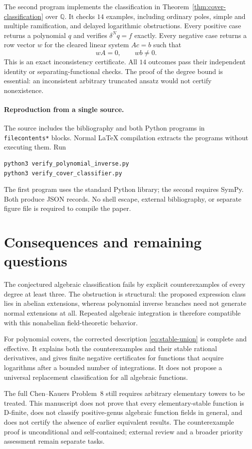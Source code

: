 The second program implements the classification in
Theorem~\ref{thm:cover-classification} over $\mathbb Q$. It checks $14$
examples, including ordinary poles, simple and multiple ramification,
and delayed logarithmic obstructions. Every positive case returns a
polynomial $q$ and verifies $\delta^Nq=f$ exactly. Every negative case
returns a row vector $w$ for the cleared linear system $Ac=b$ such that
\[
 wA=0,\qquad wb\ne0.
\]
This is an exact inconsistency certificate. All $14$ outcomes pass their
independent identity or separating-functional checks. The proof of the
degree bound is essential: an inconsistent arbitrary truncated ansatz
would not certify nonexistence.

\paragraph{Reproduction from a single source.}
The source includes the bibliography and both Python programs in
\texttt{filecontents*} blocks. Normal LaTeX compilation extracts the
programs without executing them. Run
\begin{verbatim}
python3 verify_polynomial_inverse.py
python3 verify_cover_classifier.py
\end{verbatim}
The first program uses the standard Python library; the second requires
SymPy. Both produce JSON records. No shell escape, external bibliography,
or separate figure file is required to compile the paper.

\section{Consequences and remaining questions}
The conjectured algebraic classification fails by explicit counterexamples
of every degree at least three. The obstruction is structural: the
proposed expression class lies in abelian extensions, whereas polynomial
inverse branches need not generate normal extensions at all. Repeated
algebraic integration is therefore compatible with this nonabelian
field-theoretic behavior.

For polynomial covers, the corrected description
\eqref{eq:stable-union} is complete and effective. It explains both the
counterexamples and their stable rational derivatives, and gives finite
negative certificates for functions that acquire logarithms after a
bounded number of integrations. It does not propose a universal
replacement classification for all algebraic functions.

The full Chen--Kauers Problem~8 still requires arbitrary elementary
towers to be treated. This manuscript does not prove that every
elementary-stable function is D-finite, does not classify positive-genus
algebraic function fields in general, and does not certify the absence
of earlier equivalent results. The counterexample proof is unconditional
and self-contained; external review and a broader priority assessment
remain separate tasks.

